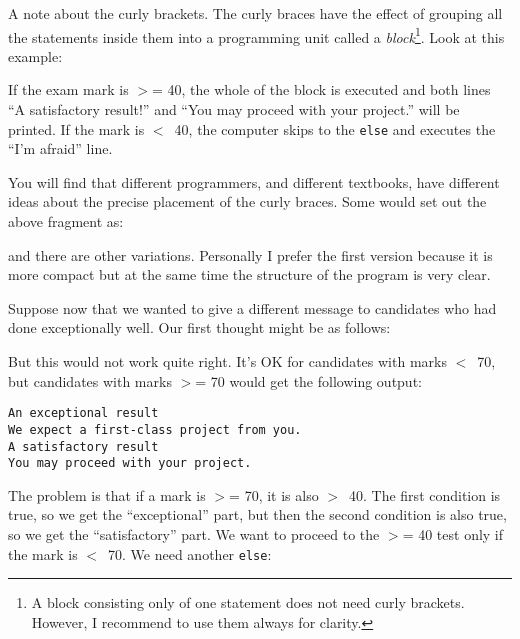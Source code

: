 
A note about the curly brackets. The curly braces have the effect of
grouping all the statements inside 
them into a programming unit called a \emph{block}\footnote{A block
  consisting only of one statement does not need curly
  brackets. However, I recommend to use them always for
  clarity.}. Look at this example: 


If the exam mark is $>$= 40, the whole of the block is executed and both
lines ``A satisfactory result!'' and ``You may proceed with your
project.'' will be printed.  If the mark is $<$~40, the computer skips to
the \verb!else! and executes the ``I'm afraid'' line.

You will find that different programmers, and different textbooks, have
different ideas about the precise placement of the curly braces.  Some would
set out the above fragment as:


and there are other variations. Personally I prefer the first version
because it is more compact but at the same time the structure of the
program is very clear. 

Suppose now that we wanted to give a different message to candidates who
had done exceptionally well. Our first thought might be as follows:


But this would not work quite right.  It's OK for candidates with marks $<$~70,
but candidates with marks $>$= 70 would get the following output:

\begin{Verbatim}
An exceptional result
We expect a first-class project from you.
A satisfactory result
You may proceed with your project.
\end{Verbatim}

The problem is that if a mark is $>$= 70, it is also $>$~40.  The first
condition is true, so we get the ``exceptional'' part, but then the second
condition is also true, so we get the ``satisfactory'' part.  We want to
proceed to the $>$= 40 test only if the mark is $<$~70.  We need another
\verb!else!:

